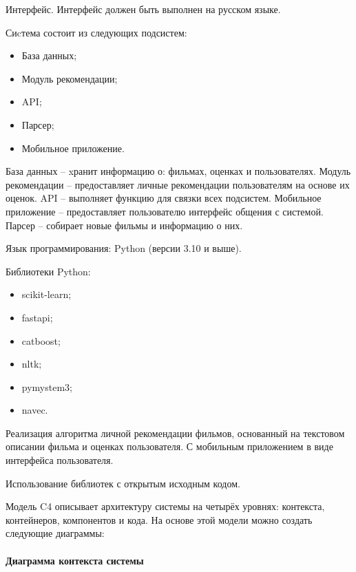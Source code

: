 Интерфейс.
Интерфейс должен быть выполнен на русском языке.



Сиcтема состоит из следующих подсистем:
\begin{itemize}
	\item База данных;
	\item Модуль рекомендации;
	\item API;
	\item Парсер;
	\item Мобильное приложение.
\end{itemize}

База данных -- xранит информацию о: фильмах, оценках и пользователях.
Модуль рекомендации -- предоставляет личные рекомендации пользователям на основе их оценок.
API -- выполняет функцию для связки всех подсистем.
Мобильное приложение -- предоставляет пользователю интерфейс общения с системой.
Парсер -- собирает новые фильмы и информацию о них.


Язык программирования: Python (версии 3.10 и выше).

Библиотеки Python:

\begin{itemize}
	\item scikit-learn;
	\item fastapi;
	\item catboost;
	\item nltk;
	\item pymystem3;
	\item navec.
\end{itemize}


Реализация алгоритма личной рекомендации фильмов, основанный на текстовом описании фильма и оценках пользователя.
С мобильным приложением в виде интерфейса пользователя.


Использование библиотек с открытым исходным кодом.


Модель C4 описывает архитектуру системы на четырёх уровнях:
контекста, контейнеров, компонентов и кода.
На основе этой модели можно создать следующие диаграммы:

\paragraph{Диаграмма контекста системы}

